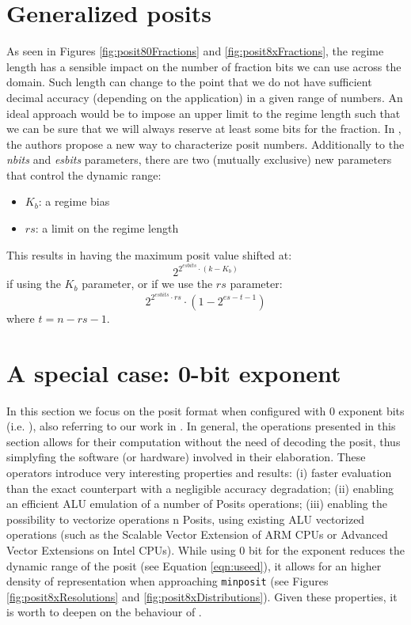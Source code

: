 \section{Generalized posits}

As seen in Figures \ref{fig:posit80Fractions} and \ref{fig:posit8xFractions}, the regime length has a sensible impact on the number of fraction bits we can use across the domain. Such length can change to the point that we do not have sufficient decimal accuracy (depending on the application) in a given range of numbers. 
An ideal approach would be to impose an upper limit to the regime length such that we can be sure that we will always reserve at least some bits for the fraction.
In \cite{9151086}, the authors propose a new way to characterize posit numbers. Additionally to the \textit{nbits}  and \textit{esbits} parameters, there are two (mutually exclusive) new parameters that control the dynamic range:
\begin{itemize}
    \item $K_b$: a regime bias 
    \item $rs$: a limit on the regime length
\end{itemize}
This results in having the maximum posit value shifted at:
\begin{equation}
    2^{2^{esbits} \cdot (k-K_b)}
\end{equation}
if using the $K_b$ parameter, or if we use the $rs$ parameter:
\begin{equation}
    2^{2^{esbits} \cdot rs} \cdot (1 - 2^{es - t - 1})
\end{equation}
where $ t = n - rs - 1$.


\section{A special case: 0-bit exponent}\label{sec:Posit0bitExponent}

In this section we focus on the posit format when configured with 0 exponent bits (i.e. ), also referring to our work in \cite{coco2020sensors}. In general, the operations presented in this section allows for their computation without the need of decoding the posit, thus simplyfing the software (or hardware) involved in their elaboration. These operators introduce very interesting properties and results: (i) faster evaluation than the exact counterpart with a negligible accuracy degradation; (ii) enabling an efficient ALU emulation of a number of Posits operations; (iii) enabling the possibility to vectorize operations n Posits, using existing ALU vectorized operations (such as the Scalable Vector Extension of ARM CPUs or Advanced Vector Extensions on Intel CPUs). While using 0 bit for the exponent reduces the dynamic range of the posit (see Equation \eqref{eqn:useed}), it allows for an higher density of representation when approaching \texttt{minposit} (see Figures \ref{fig:posit8xResolutions} and \ref{fig:posit8xDistributions}). Given these properties, it is worth to deepen on the behaviour of .

